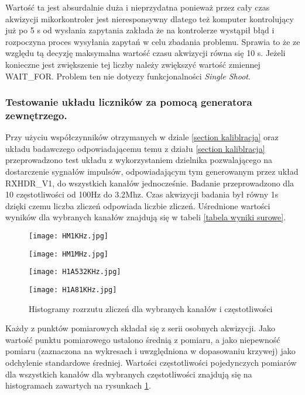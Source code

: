 Wartość ta jest absurdalnie duża i nieprzydatna ponieważ przez cały czas akwizycji mikorkontroler jest nieresponsywny dlatego też komputer kontrolujący już po 5 s od wysłania zapytania zakłada że na kontrolerze wystąpił błąd i rozpoczyna proces wysyłania zapytań w celu zbadania problemu. Sprawia to że ze względu tą decyzję maksymalna wartość czasu akwizycji równa się 10 s. Jeżeli konieczne jest zwiększenie tej liczby należy zwiększyć wartość zmiennej WAIT\_FOR. Problem ten nie dotyczy funkcjonalności \textit{Single Shoot}.   

\subsubsection{Testowanie układu liczników za pomocą generatora zewnętrzego.}

Przy użyciu współczynników otrzymanych w dziale \ref{section kaliblracja} oraz układu badawczego odpowiadającemu temu z działu \ref{section kaliblracja} przeprowadzono test układu z wykorzystaniem dzielnika pozwalającego na dostarczenie sygnałów impulsów, odpowiadającym tym generowanym przez układ RXHDR\_V1, do wszystkich kanałów jednocześnie.
Badanie przeprowadzono dla 10 częstotliwości od 100Hz do 3.2Mhz. Czas akwizycji badania był równy 1s dzięki czemu liczba zliczeń odpowiada liczbie zliczeń. Uśrednione wartości wyników dla wybranych kanałów znajdują się w tabeli \ref{tabela wyniki surowe}.

\begin{figure}
        \begin{multicols}{2}
            \texttt{[image: HM1KHz.jpg]} \par    
            \texttt{[image: HM1MHz.jpg]} \par    
        \end{multicols} \hfill
        \begin{multicols}{2}
            \texttt{[image: H1A532KHz.jpg]} \par
            \texttt{[image: H1A81KHz.jpg]} \par    
        \end{multicols}
        \caption{Histogramy rozrzutu zliczeń dla wybranych kanałów i częstotliwości}
        \label{hist licz}
\end{figure}



Każdy z punktów pomiarowych składał się z serii osobnych akwizycji. Jako wartość punktu pomiarowego ustalono średnią z pomiaru, a jako niepewność pomiaru (zaznaczona na wykresach i uwzględniona w dopasowaniu krzywej) jako odchylenie standardowe średniej. Wartości częstotliwości pojedynczych pomiarów dla wszystkich kanałów dla wybranych częstotliwości znajdują się na histogramach zawartych na rysunkach \ref{hist licz}. 

